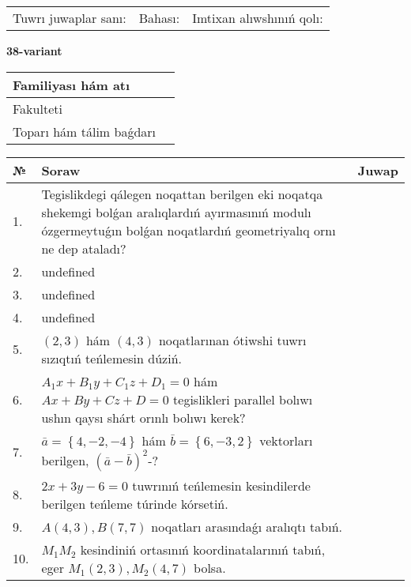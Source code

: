 \documentclass{article}
\begin{document}
\vspace{0.7cm}

\begin{tabular}{lll}
Tuwrı juwaplar sanı: \underline{\hspace{1cm}} & 
Bahası: \underline{\hspace{1cm}} & 
Imtixan alıwshınıń qolı: \underline{\hspace{2cm}} \\
\end{tabular}

\egroup

\newpage


\textbf{38-variant}\\

\bgroup
\def\arraystretch{1.6} %

\begin{tabular}{|m{5.7cm}|m{9.5cm}|}
\hline
Familiyası hám atı & \\
\hline
Fakulteti  & \\
\hline
Toparı hám tálim baǵdarı  & \\
\hline
\end{tabular}

\vspace{0.7cm}

\begin{tabular}{|m{0.7cm}|m{10cm}|m{4cm}|}
\hline
№ & Soraw & Juwap \\
\hline
1. & Tegislikdegi qálegen noqattan berilgen eki noqatqa shekemgi bolǵan aralıqlardıń ayırmasınıń modulı ózgermeytuǵın bolǵan noqatlardıń geometriyalıq ornı ne dep ataladı? &  \\
\hline
2. & undefined &  \\
\hline
3. & undefined &  \\
\hline
4. & undefined &  \\
\hline
5. & $(2, 3)$ hám $(4, 3)$ noqatlarınan ótiwshi tuwrı sızıqtıń teńlemesin dúziń. &  \\
\hline
6. & \(A_{1}x + B_{1}y + C_{1}z + D_{1} = 0\) hám \(Ax + By + Cz + D = 0\) tegislikleri parallel bolıwı ushın qaysı shárt orınlı bolıwı kerek? &  \\
\hline
7. & \(\bar{a} = \left\{ 4,- 2,- 4 \right\}\) hám \(\bar{b} = \left\{ 6,- 3, 2 \right\}\) vektorları berilgen, \((\bar{a} - \bar{b}) ^{2}\)-? &  \\
\hline
8. & \(2 x + 3 y - 6 = 0\) tuwrınıń teńlemesin kesindilerde berilgen teńleme túrinde kórsetiń. &  \\
\hline
9. & \(A (4, 3), B (7, 7)\) noqatları arasındaǵı aralıqtı tabıń. &  \\
\hline
10. & \(M_{1}M_{2}\) kesindiniń ortasınıń koordinatalarınıń tabıń, eger \(M_{1} (2, 3), M_{2} (4, 7)\) bolsa. & \\
\hline
\end{tabular}
\end{document}
